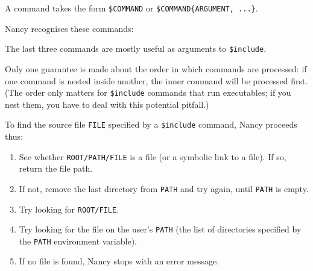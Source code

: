 \documentclass[a4paper,english]{scrartcl}
\begin{document}
A command takes the form \verb|$COMMAND| or \verb|$COMMAND{ARGUMENT, ...}|.

Nancy recognises these commands:


The last three commands are mostly useful as arguments to \verb|$include|.

Only one guarantee is made about the order in which commands are processed: if one command is nested inside another, the inner command will be processed first. (The order only matters for \verb|$include| commands that run executables; if you nest them, you have to deal with this potential pitfall.)

To find the source file \verb|FILE| specified by a \verb|$include| command, Nancy proceeds thus:

\begin{enumerate}
\item See whether \verb|ROOT/PATH/FILE| is a file (or a symbolic link to a file). If so, return the file path.
\item If not, remove the last directory from \verb|PATH| and try again, until \verb|PATH| is empty.
\item Try looking for \verb|ROOT/FILE|.
\item Try looking for the file on the user’s \verb|PATH| (the list of directories specified by the \verb|PATH| environment variable).
\item If no file is found, Nancy stops with an error message.
\end{enumerate}
\end{document}
